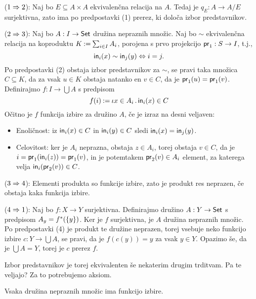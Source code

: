 \begin{dokaz}
  ($1 \lthen 2$):
  Naj bo $E \subseteq A \times A$ ekvivalenčna relacija na $A$. Tedaj je $q_E : A \to A/E$
  surjektivna, zato ima po predpostavki (1) prerez, ki določa izbor predstavnikov.

  ($2 \lthen 3$):
  Naj bo $A : I \to \Set$ družina nepraznih množic. Naj bo $\sim$ ekvivalenčna relacija
  na koproduktu $K \defeq \sum_{i \in I} A_i$, porojena s prvo projekcijo $\fst : S \to I$, t.j.,
  \begin{equation*}
    \inj[i](x) \sim \inj[j](y) \liff i = j.
  \end{equation*}
  Po predpostavki (2) obstaja izbor predstavnikov za $\sim$, se pravi taka množica $C \subseteq K$, da
  za vsak $u \in K$ obstaja natanko en $v \in C$, da je $\fst(u) = \fst(v)$. Definirajmo $f : I \to
  \bigcup A$ s predpisom
  \begin{equation*}
    f(i) \defeq \descr{x \in A_i} \inj[i](x) \in C
  \end{equation*}
  Očitno je $f$ funkcija izbire za družino $A$, če je izraz na desni veljaven:
  \begin{itemize}
  \item Enoličnost: iz $\inj[i](x) \in C$ in $\inj[i](y) \in C$ sledi $\inj[i](x) = \inj[j](y)$.
  \item Celovitost: ker je $A_i$ neprazna, obstaja $z \in A_i$, torej obstaja $v \in C$, da je
    $i = \fst(\inj[i](z)) = \fst(v)$, in je potemtakem $\snd(v) \in A_i$ element, za katerega velja
    $\inj[i](\snd(v)) \in C$.
  \end{itemize}

  ($3 \lthen 4$):
  Elementi produkta so funkcije izbire, zato je produkt res neprazen, če obstaja
  kaka funkcija izbire.

  ($4 \lthen 1$):
  Naj bo $f : X \to Y$ surjektivna. Definirajmo družino $A : Y \to \Set$ s
  predpisom $A_y = \invimg{f}(\set{y})$. Ker je $f$ surjektivna, je $A$ družina nepraznih
  množic. Po predpostavki (4) je produkt te družine neprazen, torej vsebuje neko
  funkcijo izbire $c : Y \to \bigcup A$, se pravi, da je $f(c(y)) = y$ za vsak $y \in Y$.
  Opazimo še, da je $\bigcup A = Y$, torej je $c$ prerez $f$.
\end{dokaz}

Izbor predstavnikov je torej ekvivalenten še nekaterim drugim trditvam. Pa te veljajo? Za
to potrebujemo aksiom.

\begin{aksiom}
  Vsaka družina nepraznih množic ima funkcijo izbire.
\end{aksiom}

